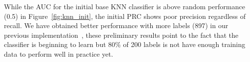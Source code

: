 While the AUC for the initial base KNN classifier is above random performance (0.5) in Figure~\ref{fig:knn_init}, 
the initial PRC shows poor precision regardless of recall.
We have obtained better performance with more labels (897) in our previous implementation~\cite{tchoua2019polyner}, these preliminary results point to the fact that the classifier is beginning to learn but 80\% of 200 labels is not have enough training data to perform well in practice yet.



